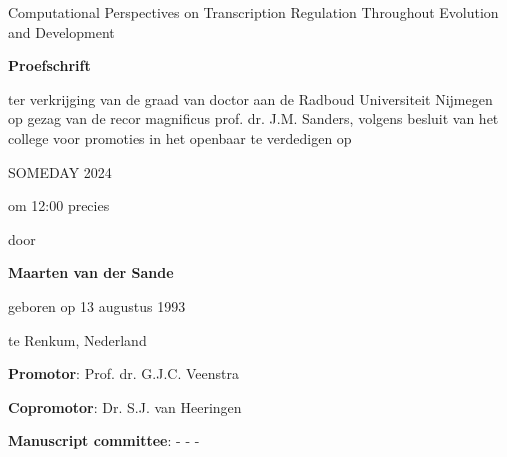 \vspace*{\fill}
\begin{center}


{\huge Computational Perspectives on Transcription Regulation Throughout Evolution and Development}

\vspace{1cm}

\textbf{{\large Proefschrift}}

\vspace{1cm}

ter verkrijging van de graad van doctor aan de Radboud Universiteit Nijmegen op gezag van de recor magnificus prof. dr. J.M. Sanders, volgens besluit van het college voor promoties in het openbaar te verdedigen op

\vspace{1cm}

SOMEDAY 2024

\vspace{1cm}

om 12:00 precies

\vspace{1cm}

door

\vspace{1cm}

\textbf{Maarten van der Sande}

geboren op 13 augustus 1993

te Renkum, Nederland

\end{center}
\vspace*{\fill}

\newpage

{\parindent0pt
\textbf{Promotor}:\newline
Prof. dr. G.J.C. Veenstra
\vspace{0.5cm}

\textbf{Copromotor}:\newline
Dr. S.J. van Heeringen
\vspace{0.5cm}

\textbf{Manuscript committee}:\newline
- \newline
- \newline
- \newline
}
\newpage

\setcounter{tocdepth}{0}
\tableofcontents
